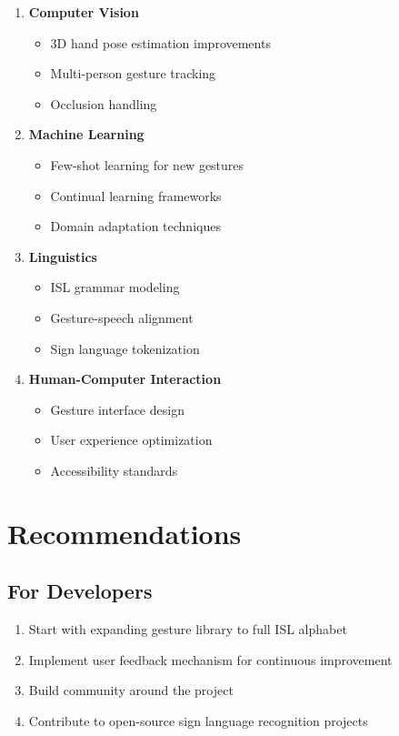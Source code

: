 \begin{enumerate}
    \item \textbf{Computer Vision}
    \begin{itemize}
        \item 3D hand pose estimation improvements
        \item Multi-person gesture tracking
        \item Occlusion handling
    \end{itemize}
    
    \item \textbf{Machine Learning}
    \begin{itemize}
        \item Few-shot learning for new gestures
        \item Continual learning frameworks
        \item Domain adaptation techniques
    \end{itemize}
    
    \item \textbf{Linguistics}
    \begin{itemize}
        \item ISL grammar modeling
        \item Gesture-speech alignment
        \item Sign language tokenization
    \end{itemize}
    
    \item \textbf{Human-Computer Interaction}
    \begin{itemize}
        \item Gesture interface design
        \item User experience optimization
        \item Accessibility standards
    \end{itemize}
\end{enumerate}

\section{Recommendations}

\subsection{For Developers}

\begin{enumerate}
    \item Start with expanding gesture library to full ISL alphabet
    \item Implement user feedback mechanism for continuous improvement
    \item Build community around the project
    \item Contribute to open-source sign language recognition projects
\end{enumerate}

